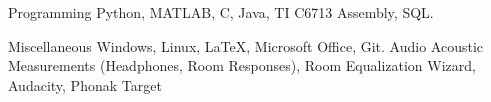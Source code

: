 

\begin{cvskills}

  \cvskill
    {Programming} %
    {Python, MATLAB, C, Java, TI C6713 Assembly, SQL.} %

  \cvskill
    {Miscellaneous} %
    {Windows, Linux, \LaTeX, Microsoft Office, Git.} %
  \cvskill
    {Audio} %
    {Acoustic Measurements (Headphones, Room Responses), Room Equalization Wizard, Audacity, Phonak Target} %

\end{cvskills}

